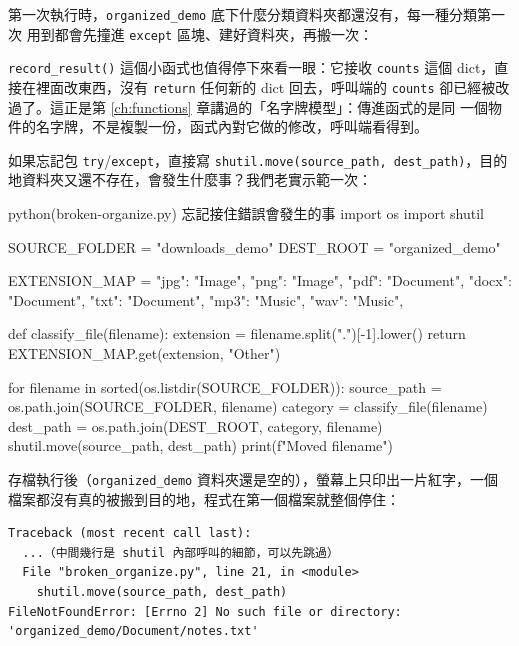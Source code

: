 第一次執行時，\texttt{organized\_demo} 底下什麼分類資料夾都還沒有，每一種分類第一次
用到都會先撞進 \texttt{except} 區塊、建好資料夾，再搬一次：



\texttt{record\_result()} 這個小函式也值得停下來看一眼：它接收 \texttt{counts} 這個
dict，直接在裡面改東西，沒有 \texttt{return} 任何新的 dict 回去，呼叫端的
\texttt{counts} 卻已經被改過了。這正是第 \ref{ch:functions} 章講過的「名字牌模型」：傳進函式的是同
一個物件的名字牌，不是複製一份，函式內對它做的修改，呼叫端看得到。

如果忘記包 \texttt{try}/\texttt{except}，直接寫 \texttt{shutil.move(source\_path,
dest\_path)}，目的地資料夾又還不存在，會發生什麼事？我們老實示範一次：

\begin{example}{python}{(broken-organize.py) 忘記接住錯誤會發生的事}
import os
import shutil

SOURCE_FOLDER = "downloads_demo"
DEST_ROOT = "organized_demo"

EXTENSION_MAP = {
    "jpg": "Image", "png": "Image",
    "pdf": "Document", "docx": "Document", "txt": "Document",
    "mp3": "Music", "wav": "Music",
}


def classify_file(filename):
    extension = filename.split(".")[-1].lower()
    return EXTENSION_MAP.get(extension, "Other")


for filename in sorted(os.listdir(SOURCE_FOLDER)):
    source_path = os.path.join(SOURCE_FOLDER, filename)
    category = classify_file(filename)
    dest_path = os.path.join(DEST_ROOT, category, filename)
    shutil.move(source_path, dest_path)
    print(f"Moved {filename}")
\end{example}

存檔執行後（\texttt{organized\_demo} 資料夾還是空的），螢幕上只印出一片紅字，一個
檔案都沒有真的被搬到目的地，程式在第一個檔案就整個停住：

\begin{verbatim}
Traceback (most recent call last):
  ...（中間幾行是 shutil 內部呼叫的細節，可以先跳過）
  File "broken_organize.py", line 21, in <module>
    shutil.move(source_path, dest_path)
FileNotFoundError: [Errno 2] No such file or directory:
'organized_demo/Document/notes.txt'
\end{verbatim}

